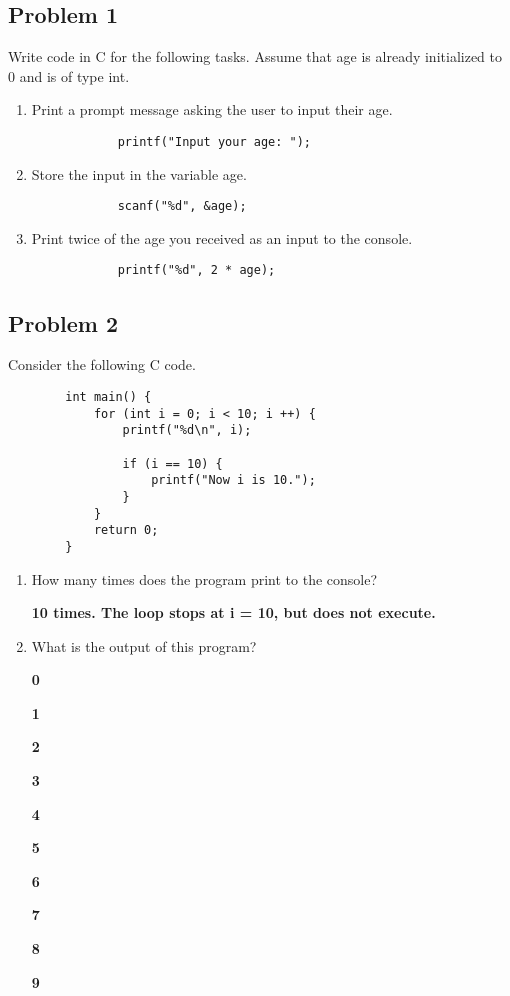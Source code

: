 \documentclass{article}
\begin{document}
\subsection*{Problem 1}
    Write code in C for the following tasks. Assume that age is already initialized to 0 and is of type int.
        \begin{enumerate}[label=\alph*.]
            \item Print a prompt message asking the user to input their age.

            \begin{verbatim}
            printf("Input your age: ");
            \end{verbatim}
            \item Store the input in the variable age.

            \begin{verbatim}
            scanf("%d", &age);
            \end{verbatim}
            \item Print twice of the age you received as an input to the console.

            \begin{verbatim}
            printf("%d", 2 * age);
            \end{verbatim}
        \end{enumerate}
        
\subsection*{Problem 2}
    Consider the following C code.
    \begin{verbatim}
        int main() {
            for (int i = 0; i < 10; i ++) {
                printf("%d\n", i);

                if (i == 10) {
                    printf("Now i is 10.");
                }
            }
            return 0;
        }
    \end{verbatim}

    \begin{enumerate}[label=\alph*.]
        \item How many times does the program print to the console?

        \textbf{10 times. The loop stops at i = 10, but does not execute.}
        \item What is the output of this program?

        
        \textbf{0}
        
        \textbf{1}
        
        \textbf{2}
        
        \textbf{3}
        
        \textbf{4}
        
        \textbf{5}
        
        \textbf{6}
        
        \textbf{7}
        
        \textbf{8}
        
        \textbf{9}
    \end{enumerate}
\end{document}
